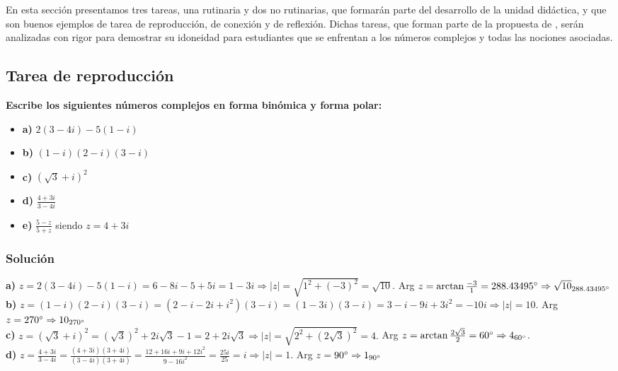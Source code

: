 \documentclass[../main.tex]{memoir}
\begin{document}
En esta sección presentamos tres tareas, una rutinaria y dos no rutinarias, que formarán parte del desarrollo de la unidad didáctica, y que son buenos ejemplos de tarea de reproducción, de conexión y de reflexión. Dichas tareas, que forman parte de la propuesta de \cite{sm1bach}, serán analizadas con rigor para demostrar su idoneidad para estudiantes que se enfrentan a los números complejos y todas las nociones asociadas.

\subsection{Tarea de reproducción}

\textbf{Escribe los siguientes números complejos en forma binómica y forma polar:}

\begin{itemize}
	\item \textbf{a)} $2(3-4i)-5(1-i)$
	\item \textbf{b)} $(1-i)(2-i)(3-i)$
	\item \textbf{c)} $(\sqrt{3}+i)^2$
	\item \textbf{d)} $\frac{4+3i}{3-4i}$
	\item \textbf{e)} $\frac{5-z}{5+z}$ siendo $z=4+3i$
\end{itemize}

\subsubsection{Solución}

\textbf{a)} $z =2(3-4i)-5(1-i) = 6-8i-5+5i = 1-3i \Rightarrow |z| = \sqrt{1^2+(-3)^2} = \sqrt{10}.$ Arg $z = \arctan \frac{-3}{1} = 288.43495\degree \Rightarrow \sqrt{10}_{288.43495\degree}$ \\

\textbf{b)} $z = (1-i)(2-i)(3-i)=(2-i-2i+i^2)(3-i)=(1-3i)(3-i)=3-i-9i+3i^2 = -10i \Rightarrow |z| = 10.$ Arg $z = 270\degree \Rightarrow 10_{270\degree}$ \\

\textbf{c)} $z = (\sqrt{3}+i)^2 = (\sqrt{3})^2 +2i \sqrt{3}-1 = 2 + 2i\sqrt{3} \Rightarrow |z| = \sqrt{2^2 + (2\sqrt{3})^2}=4.$ Arg $z = \arctan \frac{2\sqrt{3}}{2} =60\degree \Rightarrow 4_{60\degree}$. \\

\textbf{d)} $z = \frac{4+3i}{3-4i} = \frac{(4+3i)(3+4i)}{(3-4i)(3+4i)}= \frac{12+16i+9i+12i^2}{9-16i^2}= \frac{25i}{25} = i \Rightarrow |z| = 1.$ Arg $z = 90\degree \Rightarrow 1_{90\degree}$ \\
\end{document}
